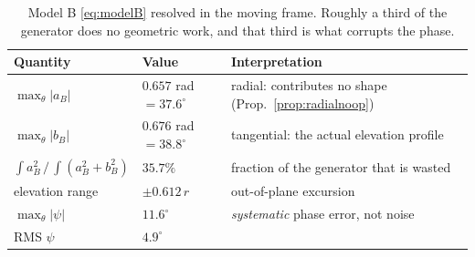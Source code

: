 \documentclass[11pt,a4paper]{article}
\begin{document}
\begin{table}[htbp]
\centering
\caption{Model B \eqref{eq:modelB} resolved in the moving frame. Roughly a
third of the generator does no geometric work, and that third is what corrupts
the phase.}
\label{tab:modelB}
\begin{tabular}{lll}
\toprule
Quantity & Value & Interpretation \\
\midrule
$\max_\theta|a_B|$ & $0.657$ rad $=37.6^\circ$ & radial: contributes no shape (Prop.~\ref{prop:radialnoop}) \\
$\max_\theta|b_B|$ & $0.676$ rad $=38.8^\circ$ & tangential: the actual elevation profile \\
$\int a_B^2 \,/\, \int(a_B^2+b_B^2)$ & $35.7\%$ & fraction of the generator that is wasted \\
elevation range & $\pm 0.612\,r$ & out-of-plane excursion \\
$\max_\theta|\psi|$ & $11.6^\circ$ & \emph{systematic} phase error, not noise \\
RMS $\psi$ & $4.9^\circ$ & \\
\bottomrule
\end{tabular}
\end{table}
\end{document}

